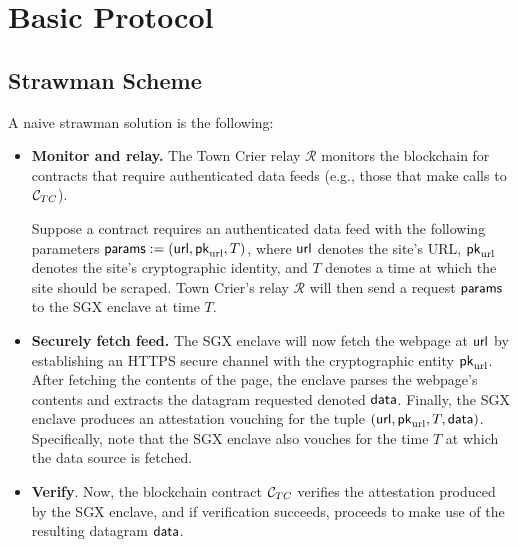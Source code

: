 \newcommand{\fsgx}{\ensuremath{\mathcal{F}_{\textrm{sgx}}}\xspace}
\newcommand{\pk}{\ensuremath{{\sf pk}}}
\newcommand{\sk}{\ensuremath{{\sf sk}}}
\newcommand{\pkM}{\ensuremath{{\sf pk}_{\mathcal{M}}}}
\newcommand{\skM}{\ensuremath{{\sf sk}_{\mathcal{M}}}}
\newcommand{\pkU}{\ensuremath{{\sf pk}_{\mathcal{U}}}}
\newcommand{\pksgx}{\ensuremath{{\sf pk}_{\textrm{sgx}}}}
\newcommand{\sksgx}{\ensuremath{{\sf sk}_{\textrm{sgx}}}}
\newcommand{\pkurl}{\ensuremath{{\sf pk}_{\textrm{url}}}\xspace}
\newcommand{\rl}{\ensuremath{{\sf RL}}}
\newcommand{\relay}{\ensuremath{\mathcal{R}}}
\newcommand{\enclaveprog}{\ensuremath{{\sf prog}_{\textrm{encl}}}}
\newcommand{\sigatt}{\ensuremath{{\sigma_{\textrm{att}}}}}
\newcommand{\sigsgx}{\ensuremath{{\Sigma_{\textrm{sgx}}}}}
\newcommand{\weburl}{\ensuremath{{{\sf url}}}\xspace}
\newcommand{\clock}{\ensuremath{{{\sf clock}}}}
\newcommand{\algA}{\ensuremath{\mathcal{A}}}
\newcommand{\algB}{\ensuremath{\mathcal{B}}}

\section{Basic Protocol}


\subsection{Strawman Scheme}
A naive strawman solution is the following:
\begin{itemize}[leftmargin=5mm]
\item
{\bf Monitor and relay.}
The Town Crier relay $\relay$    
monitors the blockchain for 
contracts that require authenticated data feeds (e.g., those
that make calls to ${\cal C}_{TC}$).

Suppose a contract requires 
an authenticated 
data feed with the following parameters ${\sf params} := (\weburl, \pkurl, T)$,
where $\weburl$ denotes the site's URL,
$\pkurl$ denotes the site's cryptographic 
identity, and $T$ denotes a time at which the site should be scraped.
Town Crier's relay $\relay$ will then send
a request ${\sf params}$ 
to the SGX enclave at time $T$.
\item
{\bf Securely fetch feed.}
The SGX enclave will now fetch the webpage at $\weburl$ by establishing
an HTTPS secure channel with 
the cryptographic entity $\pkurl$.
After fetching the contents of the page, 
the enclave parses the webpage's contents and extracts the datagram requested
denoted ${\sf data}$.
Finally, the SGX enclave produces an attestation 
vouching for the tuple $(\weburl, \pkurl, T, {\sf data})$.
Specifically, note that the SGX enclave also vouches
for the time $T$ at which the data source is fetched.
\item
{\bf Verify}.
Now, the blockchain contract ${\cal C}_{TC}$ verifies the attestation
produced by the SGX enclave, and 
if verification succeeds, proceeds to make use of 
the resulting datagram ${\sf data}$.
\end{itemize}

